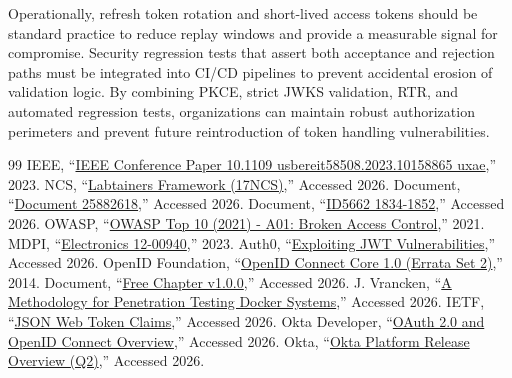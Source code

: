 \documentclass[11pt,a4paper]{report}
\begin{document}
Operationally, refresh token rotation and short-lived access tokens should be standard practice to reduce replay windows and provide a measurable signal for compromise. Security regression tests that assert both acceptance and rejection paths must be integrated into CI/CD pipelines to prevent accidental erosion of validation logic. By combining PKCE, strict JWKS validation, RTR, and automated regression tests, organizations can maintain robust authorization perimeters and prevent future reintroduction of token handling vulnerabilities.

\clearpage
{}
\begin{thebibliography}{99}
 IEEE, ``\href{run:./References/10.1109\_usbereit58508.2023.10158865\_uxae (1).pdf}{IEEE Conference Paper 10.1109 usbereit58508.2023.10158865 uxae},'' 2023.
 NCS, ``\href{run:./References/17NCS-Labtainers-Framework.pdf}{Labtainers Framework (17NCS)},'' Accessed 2026.
 Document, ``\href{run:./References/25882618.pdf}{Document 25882618},'' Accessed 2026.
 Document, ``\href{run:./References/51.+ID5662\_1834-1852.pdf}{ID5662 1834-1852},'' Accessed 2026.
 OWASP, ``\href{run:./References/A01 Broken Access Control - OWASP Top 10\_2021.html}{OWASP Top 10 (2021) - A01: Broken Access Control},'' 2021.
 MDPI, ``\href{run:./References/electronics-12-00940.pdf}{Electronics 12-00940},'' 2023.
 Auth0, ``\href{run:./References/exploiting-jwt-vulnerabilities.pdf}{Exploiting JWT Vulnerabilities},'' Accessed 2026.
 OpenID Foundation, ``\href{run:./References/Final\_ OpenID Connect Core 1.0 incorporating errata set 2.html}{OpenID Connect Core 1.0 (Errata Set 2)},'' 2014.
 Document, ``\href{run:./References/free-chapter-v1.0.0.pdf}{Free Chapter v1.0.0},'' Accessed 2026.
 J. Vrancken, ``\href{run:./References/Joren\_Vrancken\_\_\_4593847\_\_\_A\_Methodology\_for\_Penetration\_Testing\_Docker\_Systems.pdf}{A Methodology for Penetration Testing Docker Systems},'' Accessed 2026.
 IETF, ``\href{run:./References/json-web-token-claims.md}{JSON Web Token Claims},'' Accessed 2026.
 Okta Developer, ``\href{run:./References/OAuth 2.0 and OpenID Connect overview \_ Okta Developer.html}{OAuth 2.0 and OpenID Connect Overview},'' Accessed 2026.
 Okta, ``\href{run:./References/Q2 Okta Platform Release Overview.pdf}{Okta Platform Release Overview (Q2)},'' Accessed 2026.

\end{thebibliography}
\end{document}
